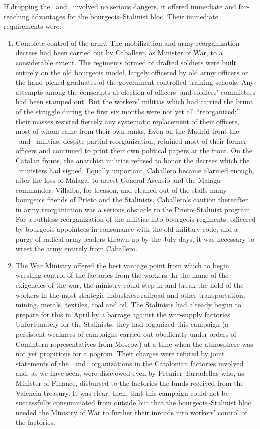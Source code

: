 If dropping the \UGT\ and \CNT\ involved no serious dangers, it offered immediate and far-reaching advantages for the bourgeois--Stalinist bloc. Their immediate requirements were:

\begin{enumerate}
  \item Complete control of the army. The mobilization and army reorganization decrees had been carried out by Caballero, as Minister of War, to a considerable extent. The regiments formed of drafted soldiers were built entirely on the old bourgeois model, largely officered by old army officers or the hand-picked graduates of the government-controlled training schools. Any attempts among the conscripts at election of officers’ and soldiers’ committees had been stamped out. But the workers’ militias which had carried the brunt of the struggle during the first six months were not yet all ``reorganized;'' their masses resisted fiercely any systematic replacement of their officers, most of whom came from their own ranks. Even on the Madrid front the \CNT\ and \UGT\ militias, despite partial reorganization, retained most of their former officers and continued to print their own political papers at the front. On the Catalan fronts, the anarchist militias refused to honor the decrees which the \CNT\ ministers had signed. Equally important, Caballero became alarmed enough, after the loss of M\'alaga, to arrest General Asensio and the Malaga commander, Villalba, for treason, and cleaned out of the staffs many bourgeois friends of Prieto and the Stalinists. Caballero’s caution thereafter in army reorganiation was a serious obstacle to the Prieto--Stalinist program. For a ruthless reorganization of the militias into bourgeois regiments, officered by bourgeois appointees in consonance with the old military code, and a purge of radical army leaders thrown up by the July days, it was necessary to wrest the army entirely from Caballero.
  
  \item The War Ministry offered the best vantage point from which to begin wresting control of the factories from the workers. In the name of the exigencies of the war, the ministry could step in and break the hold of the workers in the most strategic industries: railroad and other transportation, mining, metals, textiles, coal and oil. The Stalinists had already begun to prepare for this in April by a barrage against the war-supply factories. Unfortunately for the Stalinists, they had organized this campaign (a persistent weakness of campaigns carried out obediently under orders of Comintern representatives from Moscow) at a time when the atmosphere was not yet propitious for a pogrom. Their charges were refuted by joint statements of the \CNT\ and \UGT\ organizations in the Catalonian factories involved and, as we have seen, were disavowed even by Premier Tarradellas who, as Minister of Finance, disbursed to the factories the funds received from the Valencia treasury. It was clear, then, that this campaign could not be successfully consummated from outside but that the bourgeois--Stalinist bloc needed the Ministry of War to further their inroads into workers’ control of the factories.
  

\end{enumerate}
